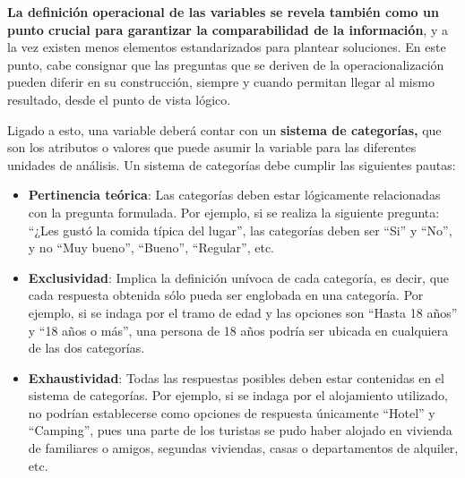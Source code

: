 \documentclass[
]{book}
\begin{document}
\hfill\break
\textbf{La definición operacional de las variables se revela también como un punto crucial para garantizar la comparabilidad de la información}, y a la vez existen menos elementos estandarizados para plantear soluciones. En este punto, cabe consignar que las preguntas que se deriven de la operacionalización pueden diferir en su construcción, siempre y cuando permitan llegar al mismo resultado, desde el punto de vista lógico.

Ligado a esto, una variable deberá contar con un \textbf{sistema de categorías,} que son los atributos o valores que puede asumir la variable para las diferentes unidades de análisis. Un sistema de categorías debe cumplir las siguientes pautas:

\begin{itemize}
\item
  \textbf{Pertinencia teórica}: Las categorías deben estar lógicamente relacionadas con la pregunta formulada. Por ejemplo, si se realiza la siguiente pregunta: ``¿Les gustó la comida típica del lugar'', las categorías deben ser ``Si'' y ``No'', y no ``Muy bueno'', ``Bueno'', ``Regular'', etc.
\item
  \textbf{Exclusividad}: Implica la definición unívoca de cada categoría, es decir, que cada respuesta obtenida sólo pueda ser englobada en una categoría. Por ejemplo, si se indaga por el tramo de edad y las opciones son ``Hasta 18 años'' y ``18 años o más'', una persona de 18 años podría ser ubicada en cualquiera de las dos categorías.
\item
  \textbf{Exhaustividad}: Todas las respuestas posibles deben estar contenidas en el sistema de categorías. Por ejemplo, si se indaga por el alojamiento utilizado, no podrían establecerse como opciones de respuesta únicamente ``Hotel'' y ``Camping'', pues una parte de los turistas se pudo haber alojado en vivienda de familiares o amigos, segundas viviendas, casas o departamentos de alquiler, etc.
\end{itemize}
\end{document}
